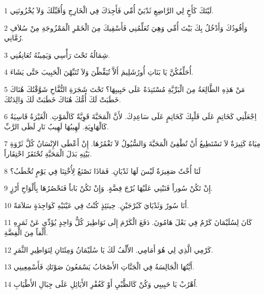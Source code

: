 \par 1 لَيْتَكَ كَأَخٍ لِي الرَّاضِعِ ثَدْيَيْ أُمِّي فَأَجِدَكَ فِي الْخَارِجِ وَأُقَبِّلَكَ وَلاَ يُخْزُونَنِي.
\par 2 وَأَقُودُكَ وَأَدْخُلُ بِكَ بَيْتَ أُمِّي وَهِيَ تُعَلِّمُنِي فَأَسْقِيكَ مِنَ الْخَمْرِ الْمَمْزُوجَةِ مِنْ سُلاَفِ رُمَّانِي.
\par 3 شِمَالُهُ تَحْتَ رَأْسِي وَيَمِينُهُ تُعَانِقُنِي.
\par 4 أُحَلِّفُكُنَّ يَا بَنَاتِ أُورُشَلِيمَ أَلاَّ تُيَقِّظْنَ وَلاَ تُنَبِّهْنَ الْحَبِيبَ حَتَّى يَشَاءَ.
\par 5 مَنْ هَذِهِ الطَّالِعَةُ مِنَ الْبَرِّيَّةِ مُسْتَنِدَةً عَلَى حَبِيبِهَا؟ تَحْتَ شَجَرَةِ التُّفَّاحِ شَوَّقْتُكَ هُنَاكَ خَطَبَتْ لَكَ أُمُّكَ هُنَاكَ خَطَبَتْ لَكَ وَالِدَتُكَ.
\par 6 اِجْعَلْنِي كَخَاتِمٍ عَلَى قَلْبِكَ كَخَاتِمٍ عَلَى سَاعِدِكَ. لأَنَّ الْمَحَبَّةَ قَوِيَّةٌ كَالْمَوْتِ. الْغَيْرَةُ قَاسِيَةٌ كَالْهَاوِيَةِ. لَهِيبُهَا لَهِيبُ نَارِ لَظَى الرَّبِّ.
\par 7 مِيَاهٌ كَثِيرَةٌ لاَ تَسْتَطِيعُ أَنْ تُطْفِئَ الْمَحَبَّةَ وَالسُّيُولُ لاَ تَغْمُرُهَا. إِنْ أَعْطَى الإِنْسَانُ كُلَّ ثَرْوَةِ بَيْتِهِ بَدَلَ الْمَحَبَّةِ تُحْتَقَرُ احْتِقَاراً.
\par 8 لَنَا أُخْتٌ صَغِيرَةٌ لَيْسَ لَهَا ثَدْيَانِ. فَمَاذَا نَصْنَعُ لِأُخْتِنَا فِي يَوْمٍ تُخْطَبُ؟
\par 9 إِنْ تَكُنْ سُوراً فَنَبْنِي عَلَيْهَا بُرْجَ فِضَّةٍ. وَإِنْ تَكُنْ بَاباً فَنَحْصُرُهَا بِأَلْوَاحِ أَرْزٍ.
\par 10 أَنَا سُورٌ وَثَدْيَايَ كَبُرْجَيْنِ. حِينَئِذٍ كُنْتُ فِي عَيْنَيْهِ كَوَاجِدَةٍ سَلاَمَةً.
\par 11 كَانَ لِسُلَيْمَانَ كَرْمٌ فِي بَعْلَ هَامُونَ. دَفَعَ الْكَرْمَ إِلَى نَوَاطِيرَ كُلُّ وَاحِدٍ يُؤَدِّي عَنْ ثَمَرِهِ أَلْفاً مِنَ الْفِضَّةِ.
\par 12 كَرْمِي الَّذِي لِي هُوَ أَمَامِي. الأَلْفُ لَكَ يَا سُلَيْمَانُ وَمِئَتَانِ لِنَوَاطِيرِ الثَّمَرِ.
\par 13 أَيَّتُهَا الْجَالِسَةُ فِي الْجَنَّاتِ الأَصْحَابُ يَسْمَعُونَ صَوْتَكِ فَأَسْمِعِينِي.
\par 14 اُهْرُبْ يَا حَبِيبِي وَكُنْ كَالظَّبْيِ أَوْ كَغُفْرِ الأَيَائِلِ عَلَى جِبَالِ الأَطْيَابِ.


